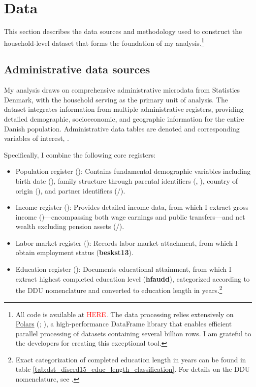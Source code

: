 \documentclass[main.tex]{subfiles}
\begin{document}
\section{Data}
\label{sec:data}

This section describes the data sources and methodology used to construct the household-level dataset that forms the foundation of my analysis.\footnote{All code is available at \textcolor{red}{HERE}. The data processing relies extensively on \href{https://github.com/pola-rs/polars}{Polars} (\textcite{polars_ritchie_vink_2025}; \textcite{polars_grouper_van_eechoud}), a high-performance DataFrame library that enables efficient parallel processing of datasets containing several billion rows. I am grateful to the developers for creating this exceptional tool.} 

\subsection{Administrative data sources}

My analysis draws on comprehensive administrative microdata from Statistics Denmark, with the household serving as the primary unit of analysis. The dataset integrates information from multiple administrative registers, providing detailed demographic, socioeconomic, and geographic information for the entire Danish population. Administrative data tables are denoted  and corresponding variables of interest, .

Specifically, I combine the following core registers:

\begin{itemize}
    \item Population register (): Contains fundamental demographic variables including birth date (), family structure through parental identifiers (, ), country of origin (), and partner identifiers (/).
    
    \item Income register (): Provides detailed income data, from which I extract gross income ()—encompassing both wage earnings and public transfers—and net wealth excluding pension assets (/).
    
    \item Labor market register (): Records labor market attachment, from which I obtain employment status (\textbf{beskst13}).
    
    \item Education register (): Documents educational attainment, from which I extract highest completed education level (\textbf{hfaudd}), categorized according to the DDU nomenclature and converted to education length in years.\footnote{Exact categorization of completed education length in years can be found in table \ref{tab:dst_disced15_educ_length_classification}. For details on the DDU nomenclature, see \textcite{dst_ddu_edu}.}
\end{itemize}
\end{document}

